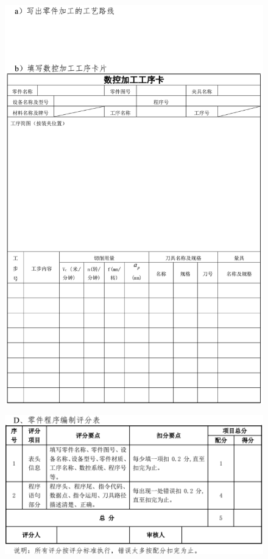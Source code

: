 \begin{figure}
	\centering
	\includegraphics[width=0.9\linewidth]{images/1-5}
	\caption{}
	\label{fig:1-1}
\end{figure}
\begin{figure}
	\centering
	\includegraphics[width=0.9\linewidth]{images/1-6}
	\caption{}
	\label{fig:1-1}
\end{figure}
